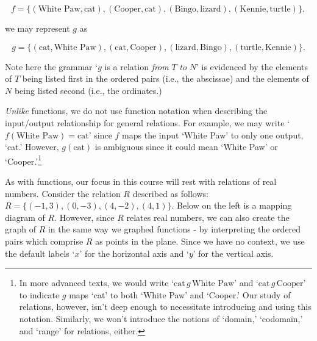 \documentclass{ximera}
\begin{document}
\[ f = \{ (\text{White Paw}, \text{cat}), (\text{Cooper}, \text{cat}), (\text{Bingo}, \text{lizard}), (\text{Kennie}, \text{turtle}) \}, \]

we may represent $g$ as 

\[ g = \{ (\text{cat}, \text{White Paw}), (\text{cat}, \text{Cooper}), ( \text{lizard}, \text{Bingo}), (\text{turtle}, \text{Kennie}) \}. \]

Note here  the grammar `$g$ is a relation \textit{from} $T$ \textit{to} $N$' is evidenced by the elements of $T$ being listed first in the ordered pairs (i.e., the abscissae) and the elements of $N$ being listed second (i.e., the ordinates.)

\smallskip

\textit{Unlike} functions, we do not use function notation when describing the input/output relationship for general relations.  For example, we may write `$f(\text{White Paw}) = \text{cat}$'  since $f$ maps the input `White Paw' to only one output, `cat.'  However, $g(\text{cat})$ is ambiguous since it could mean `White Paw' or `Cooper.'\footnote{In more advanced texts, we would write `$\text{cat} \, g \, \text{White Paw}$' and `$\text{cat} \,  g \, \text{Cooper}$' to indicate $g$ maps `cat' to both `White Paw' and `Cooper.'  Our study of relations, however, isn't deep enough to necessitate introducing and using this notation.  Similarly, we won't introduce the notions of `domain,' `codomain,' and `range' for relations, either.}

\smallskip

As with functions, our focus in this course will rest with relations of real numbers.  Consider the relation $R$ described as follows:  $R = \{ (-1,3), (0,-3), (4,-2), (4,1) \}$.  Below on the left is a mapping diagram of $R$.  However, since $R$ relates real numbers, we can also create the graph of $R$ in the same way we graphed functions - by interpreting the ordered pairs which comprise $R$ as points in the plane.  Since we have no context, we use the default labels `$x$' for the horizontal axis and `$y$' for the vertical axis.
\end{document}
